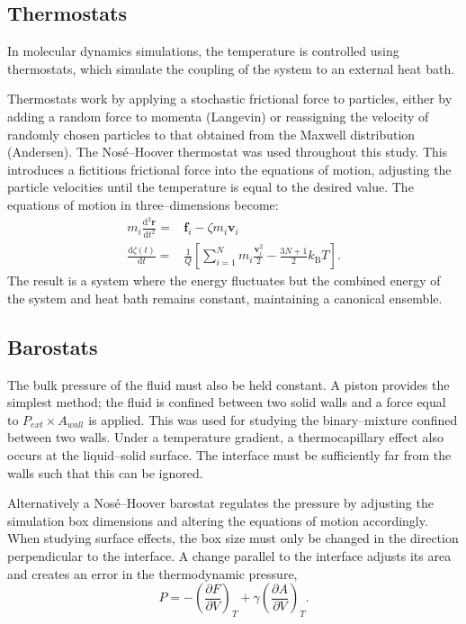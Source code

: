 \subsection{Thermostats}\label{Thermostats}
In molecular dynamics simulations, the temperature is controlled using thermostats, which simulate the coupling of the system to an external heat bath.

Thermostats work by applying a stochastic frictional force to particles, either by adding a random force to momenta (Langevin)\cite{Langevin} or reassigning the velocity of randomly chosen particles to that obtained from the Maxwell distribution (Andersen)\cite{AndersonTherm}.
The Nos\'{e}--Hoover thermostat was used throughout this study.
This introduces a fictitious frictional force into the equations of motion, adjusting the particle velocities until the temperature is equal to the desired value.\cite{NoseHoover1, NoseHoover2, NoseHoover3}
The equations of motion in three--dimensions become:
\begin{align}
m_{i}\frac{\mathrm{d}^{2}\mathbf{r}_{}}{\mathrm{d} t ^{2}} =& \mathbf{f}_{i} - \zeta m_{i} \mathbf{v}_{i}\\
\frac{\mathrm{d} \zeta (t)}{\mathrm{d} t} =& \frac{1}{Q}\left[ \sum_{i=1}^{N} m_{i} \frac{\mathbf{v}^{2}_{i}}{2} - \frac{3N+1}{2}k_{\mathrm{B}}T\right].
\end{align}
The result is a system where the energy fluctuates but the combined energy of the system and heat bath remains constant, maintaining a canonical ensemble.

\subsection{Barostats}\label{Barostats}
The bulk pressure of the fluid must also be held constant.
A piston provides the simplest method; the fluid is confined between two solid walls and a force equal to $P_{ext} \times A_{wall}$ is applied.
This was used for studying the binary--mixture confined between two walls.
Under a temperature gradient, a thermocapillary effect also occurs at the liquid--solid surface.
The interface must be sufficiently far from the walls such that this can be ignored.

Alternatively a Nos\'{e}--Hoover barostat regulates the pressure by adjusting the simulation box dimensions and altering the equations of motion accordingly. \cite{NoseHoover1, NoseHoover2, NoseHoover3}
When studying surface effects, the box size must only be changed in the direction perpendicular to the interface.
A change parallel to the interface adjusts its area and creates an error in the thermodynamic pressure,
\begin{equation}
P = - \left( \frac{\partial F}{\partial V} \right)_{T} + \gamma \left( \frac{\partial A}{\partial V} \right)_{T}.
\end{equation}

